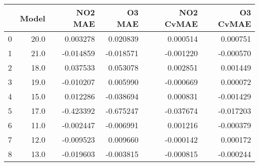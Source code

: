 \begin{tabular}{lrrrrr}
\toprule
{} &  Model &   NO2 MAE &    O3 MAE &  NO2 CvMAE &  O3 CvMAE \\
\midrule
0 &   20.0 &  0.003278 &  0.020839 &   0.000514 &  0.000751 \\
1 &   21.0 & -0.014859 & -0.018571 &  -0.001220 & -0.000570 \\
2 &   18.0 &  0.037533 &  0.053078 &   0.002851 &  0.001449 \\
3 &   19.0 & -0.010207 &  0.005990 &  -0.000669 &  0.000072 \\
4 &   15.0 &  0.012286 & -0.038694 &   0.000831 & -0.001429 \\
5 &   17.0 & -0.423392 & -0.675247 &  -0.037674 & -0.017203 \\
6 &   11.0 & -0.002447 & -0.006991 &   0.001216 & -0.000379 \\
7 &   12.0 & -0.009523 &  0.009660 &  -0.000142 &  0.000172 \\
8 &   13.0 & -0.019603 & -0.003815 &  -0.000815 & -0.000244 \\
\bottomrule
\end{tabular}
